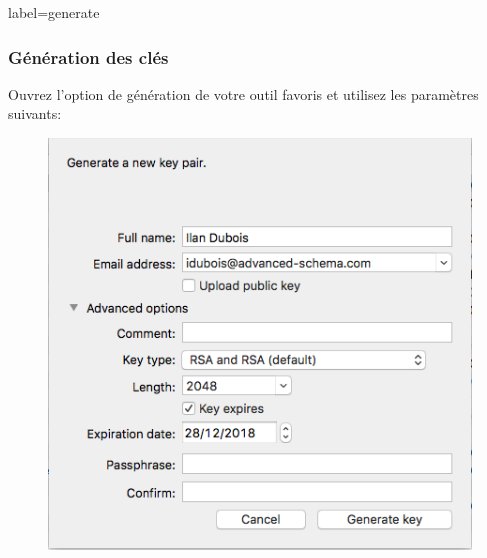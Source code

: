 \documentclass{beamer}
\begin{document}
        \begin{frame}{label=generate}
            \frametitle{Génération des clés}
            Ouvrez l'option de génération de votre outil favoris et utilisez les paramètres suivants:
            \begin{center}
                \begin{figure}
                    \includegraphics[scale=0.40]{img/gen.png}
                \end{figure}
            \end{center}
        \end{frame}
        \appendix
        \begin{frame}
            {}
            
        \end{frame}
\end{document}
